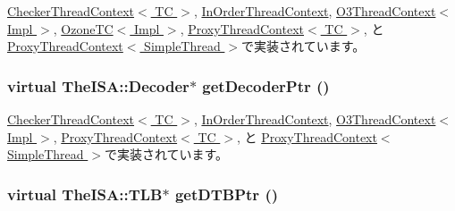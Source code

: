 \hyperlink{classCheckerThreadContext_a4f35ce7d5cb2ec57504bc2c2bc03c879}{CheckerThreadContext$<$ TC $>$}, \hyperlink{classInOrderThreadContext_a4f35ce7d5cb2ec57504bc2c2bc03c879}{InOrderThreadContext}, \hyperlink{classO3ThreadContext_ad44672c1d449c22e612a0d29a64891e6}{O3ThreadContext$<$ Impl $>$}, \hyperlink{classOzoneCPU_1_1OzoneTC_a55c840745aa3c52362144a0ef54d175c}{OzoneTC$<$ Impl $>$}, \hyperlink{classProxyThreadContext_a4f35ce7d5cb2ec57504bc2c2bc03c879}{ProxyThreadContext$<$ TC $>$}, と \hyperlink{classProxyThreadContext_a4f35ce7d5cb2ec57504bc2c2bc03c879}{ProxyThreadContext$<$ SimpleThread $>$}で実装されています。\hypertarget{classThreadContext_a14aa0e2adc88b9bc615f708aad02d80f}{
\subsubsection[{getDecoderPtr}]{\setlength{\rightskip}{0pt plus 5cm}virtual TheISA::Decoder$\ast$ getDecoderPtr ()}}
\label{classThreadContext_a14aa0e2adc88b9bc615f708aad02d80f}


\hyperlink{classCheckerThreadContext_a6ae33963bc5f8b515f0a50c483f21c7f}{CheckerThreadContext$<$ TC $>$}, \hyperlink{classInOrderThreadContext_a6ae33963bc5f8b515f0a50c483f21c7f}{InOrderThreadContext}, \hyperlink{classO3ThreadContext_a6ae33963bc5f8b515f0a50c483f21c7f}{O3ThreadContext$<$ Impl $>$}, \hyperlink{classProxyThreadContext_a6ae33963bc5f8b515f0a50c483f21c7f}{ProxyThreadContext$<$ TC $>$}, と \hyperlink{classProxyThreadContext_a6ae33963bc5f8b515f0a50c483f21c7f}{ProxyThreadContext$<$ SimpleThread $>$}で実装されています。\hypertarget{classThreadContext_a235a0443e22590632cfc95cd4f6db1ae}{
\subsubsection[{getDTBPtr}]{\setlength{\rightskip}{0pt plus 5cm}virtual TheISA::TLB$\ast$ getDTBPtr ()}}
\label{classThreadContext_a235a0443e22590632cfc95cd4f6db1ae}



